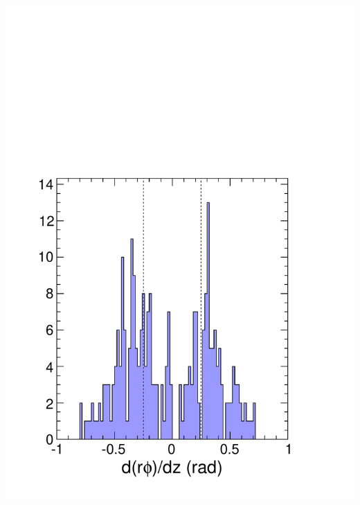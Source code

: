 \documentclass[compress]{beamer}
\begin{document}
\begin{frame}
\begin{columns}
\includegraphics[width=0.9\linewidth]{beamline_pointing_ZeroBias.pdf}
\end{columns}
\end{frame}
\end{document}
